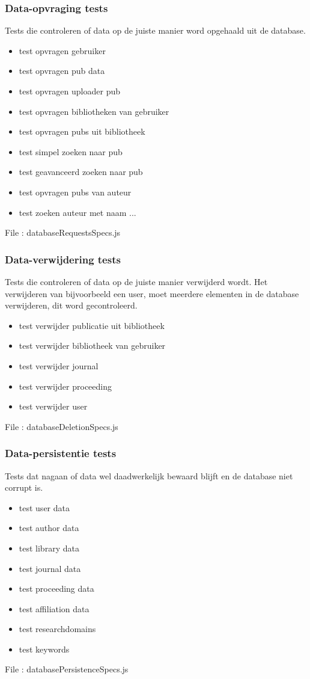 \documentclass{article}
\begin{document}
\subsubsection{Data-opvraging tests}
Tests die controleren of data op de juiste manier word opgehaald uit de database.
\begin{itemize}
\item test opvragen gebruiker
\item test opvragen pub data
\item test opvragen uploader pub
\item test opvragen bibliotheken van gebruiker
\item test opvragen pubs uit bibliotheek
\item test simpel zoeken naar pub
\item test geavanceerd zoeken naar pub
\item test opvragen pubs van auteur
\item test zoeken auteur met naam ...
\end{itemize}
File : databaseRequestsSpecs.js
\subsubsection{Data-verwijdering tests}
Tests die controleren of data op de juiste manier verwijderd wordt. Het verwijderen van bijvoorbeeld een user, moet meerdere elementen in de database verwijderen, dit word gecontroleerd.
\begin{itemize}
\item test verwijder publicatie uit bibliotheek
\item test verwijder bibliotheek van gebruiker
\item test verwijder journal
\item test verwijder proceeding
\item test verwijder user
\end{itemize}
File : databaseDeletionSpecs.js
\subsubsection{Data-persistentie tests}
Tests dat nagaan of data wel daadwerkelijk bewaard blijft en de database niet corrupt is.
\begin{itemize}
\item test user data
\item test author data
\item test library data
\item test journal data
\item test proceeding data
\item test affiliation data
\item test researchdomains
\item test keywords
\end{itemize}
File : databasePersistenceSpecs.js
\end{document}
